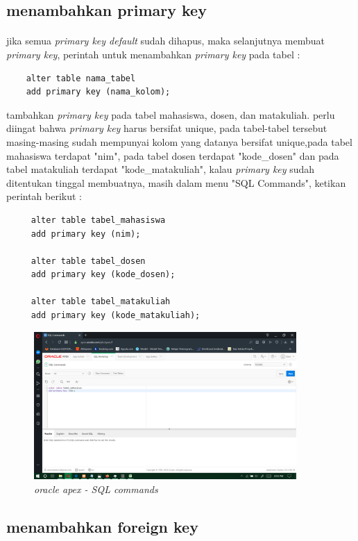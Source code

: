 \documentclass[12pt]{ociamthesis}  %
\begin{document}
\subsection{menambahkan primary key}
\paragraph{}
jika semua \textit{primary key default} sudah dihapus, maka selanjutnya membuat \textit{primary key}, perintah untuk menambahkan \textit{primary key} pada tabel :
    \begin{verbatim}
    alter table nama_tabel
    add primary key (nama_kolom);
    \end{verbatim}
tambahkan \textit{primary key} pada tabel mahasiswa, dosen, dan matakuliah. perlu diingat bahwa \textit{primary key} harus bersifat unique, pada tabel-tabel tersebut masing-masing sudah mempunyai kolom yang datanya bersifat unique,pada tabel mahasiswa terdapat "nim", pada tabel dosen terdapat "kode\_dosen" dan pada tabel matakuliah terdapat "kode\_matakuliah", kalau \textit{primary key} sudah ditentukan tinggal membuatnya,  masih dalam menu "SQL Commands", ketikan perintah berikut :
    \begin{verbatim}
     alter table tabel_mahasiswa
     add primary key (nim);

     alter table tabel_dosen
     add primary key (kode_dosen);

     alter table tabel_matakuliah
     add primary key (kode_matakuliah);
	\end{verbatim}
	\begin{figure}[H]
    \centering
	\includegraphics[width=10cm]{figures/SQL commands/Screenshot (232).png} 
    \caption{\textit{oracle apex - SQL commands}}
    \label{foto21}
 	\end{figure}	
\subsection{menambahkan foreign key}
\end{document}
